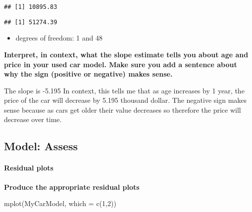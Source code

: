 \documentclass[
]{article}
\newenvironment{Shaded}{\begin{snugshade}}{\end{snugshade}}
\newcommand{\AttributeTok}[1]{\textcolor[rgb]{0.77,0.63,0.00}{#1}}
\newcommand{\DecValTok}[1]{\textcolor[rgb]{0.00,0.00,0.81}{#1}}
\newcommand{\DocumentationTok}[1]{\textcolor[rgb]{0.56,0.35,0.01}{\textbf{\textit{#1}}}}
\newcommand{\FunctionTok}[1]{\textcolor[rgb]{0.00,0.00,0.00}{#1}}
\newcommand{\NormalTok}[1]{#1}
\newcommand{\SpecialCharTok}[1]{\textcolor[rgb]{0.00,0.00,0.00}{#1}}
\providecommand{\tightlist}{%
  \setlength{\itemsep}{0pt}\setlength{\parskip}{0pt}}
\begin{document}
\begin{verbatim}
## [1] 10895.83
\end{verbatim}

\begin{Shaded}
\end{Shaded}

\begin{verbatim}
## [1] 51274.39
\end{verbatim}

\begin{itemize}
\tightlist
\item
  degrees of freedom: 1 and 48
\end{itemize}

\textbf{Interpret, in context, what the slope estimate tells you about
age and price in your used car model. Make sure you add a sentence about
why the sign (positive or negative) makes sense.}

The slope is -5.195 In context, this tells me that as age increases by 1
year, the price of the car will decrease by 5.195 thousand dollar. The
negative sign makes sense because as cars get older their value
decreases so therefore the price will decrease over time.

\hypertarget{model-assess}{%
\subsection{Model: Assess}\label{model-assess}}

\hypertarget{residual-plots}{%
\paragraph{Residual plots}\label{residual-plots}}

\textbf{Produce the appropriate residual plots}

\begin{Shaded}
\begin{Highlighting}[]
\FunctionTok{mplot}\NormalTok{(MyCarModel, }\AttributeTok{which =} \FunctionTok{c}\NormalTok{(}\DecValTok{1}\NormalTok{,}\DecValTok{2}\NormalTok{))}
\end{Highlighting}
\end{Shaded}
\end{document}
